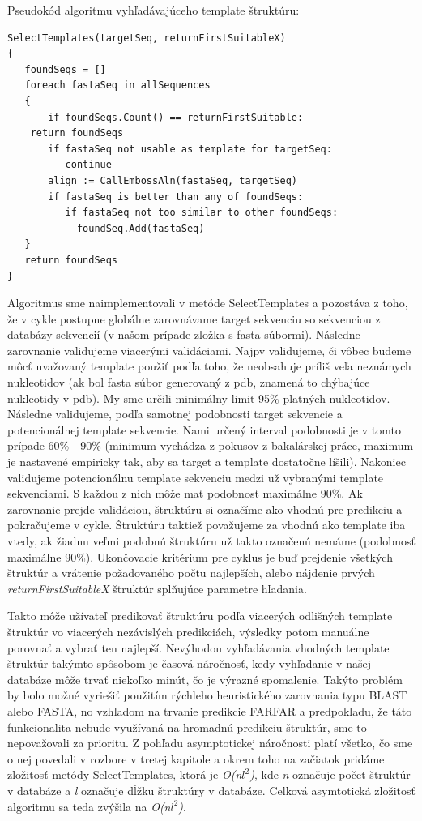 \indent Pseudokód algoritmu vyhľadávajúceho template štruktúru:
\lstset{numbers=left, numberstyle=\tiny, stepnumber=1, numbersep=5pt}
\begin{lstlisting}
SelectTemplates(targetSeq, returnFirstSuitableX)
{
   foundSeqs = []
   foreach fastaSeq in allSequences 
   {
       if foundSeqs.Count() == returnFirstSuitable:
	return foundSeqs
       if fastaSeq not usable as template for targetSeq:
          continue
       align := CallEmbossAln(fastaSeq, targetSeq)
       if fastaSeq is better than any of foundSeqs:
          if fastaSeq not too similar to other foundSeqs:
            foundSeq.Add(fastaSeq)
   }		
   return foundSeqs
}
\end{lstlisting}


\indent Algoritmus sme naimplementovali v metóde SelectTemplates a pozostáva z toho, že v cykle postupne globálne zarovnávame target sekvenciu so sekvenciou z databázy sekvencií (v našom prípade zložka s fasta súbormi). Následne  zarovnanie validujeme viacerými validáciami. Najpv validujeme, či vôbec budeme môcť uvažovaný template použiť podľa toho, že neobsahuje príliš veľa neznámych nukleotidov (ak  bol fasta súbor generovaný z pdb, znamená to chýbajúce nukleotidy v pdb). My sme určili minimálny limit 95\% platných nukleotidov. Následne validujeme, podľa samotnej podobnosti target sekvencie a potencionálnej template sekvencie. Nami určený interval podobnosti je v tomto prípade 60\% - 90\% (minimum vychádza z pokusov z bakalárskej práce, maximum je nastavené empiricky tak, aby sa target a template dostatočne líšili). Nakoniec validujeme potencionálnu template sekvenciu medzi už vybranými template sekvenciami. S každou z nich môže mať podobnosť maximálne 90\%. Ak zarovnanie prejde validáciou, štruktúru si označíme ako vhodnú pre predikciu a pokračujeme v cykle. Štruktúru taktiež považujeme za vhodnú ako template iba vtedy, ak  žiadnu veľmi podobnú štruktúru už takto označenú nemáme (podobnosť maximálne 90\%). Ukončovacie kritérium pre cyklus je buď prejdenie všetkých štruktúr a vrátenie požadovaného počtu najlepších, alebo nájdenie prvých \textit{returnFirstSuitableX} štruktúr splňujúce parametre hľadania.


\indent Takto môže užívateľ predikovať štruktúru podľa viacerých odlišných template štruktúr vo viacerých nezávislých predikciách, výsledky potom manuálne porovnať a vybrať ten najlepší. Nevýhodou vyhľadávania vhodných template štruktúr takýmto spôsobom je časová náročnosť, kedy vyhľadanie v našej databáze  môže trvať niekoľko minút, čo je výrazné spomalenie. Takýto problém by bolo možné vyriešiť použitím rýchleho heuristického zarovnania typu BLAST alebo FASTA, no vzhľadom na trvanie predikcie FARFAR a predpokladu, že táto funkcionalita nebude využívaná na hromadnú predikciu štruktúr, sme to nepovažovali za prioritu. Z pohľadu asymptotickej náročnosti platí všetko, čo sme o nej povedali v rozbore v tretej kapitole a okrem toho na začiatok pridáme zložitosť metódy SelectTemplates, ktorá je \textit{O(n$l^2$)}, kde \textit{n} označuje počet štruktúr v databáze a \textit{l} označuje dĺžku štruktúry v databáze. Celková asymtotická zložitosť algoritmu sa teda zvýšila na \textit{O(n$l^2$)}.


